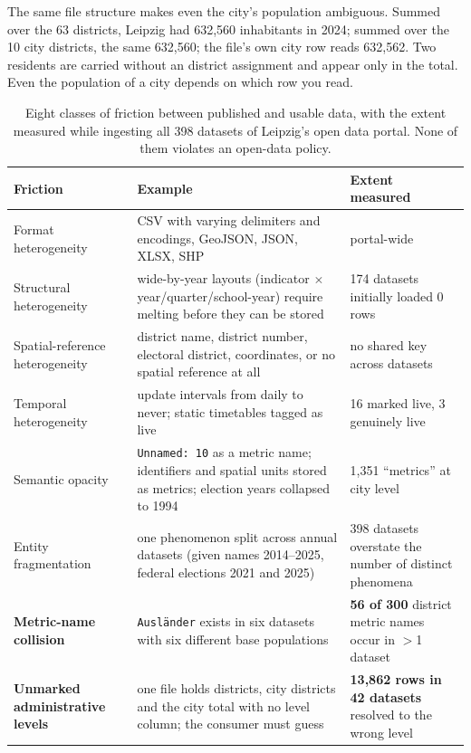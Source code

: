 \documentclass[conference,a4paper]{IEEEtran}
\begin{document}
The same file structure makes even the city's population ambiguous. Summed over
the 63 districts, Leipzig had 632{,}560 inhabitants in 2024; summed over the 10
city districts, the same 632{,}560; the file's own city row reads 632{,}562. Two
residents are carried without an district assignment and appear only in the
total. Even the population of a city depends on which row you read.

\begin{table}[t]
\caption{Eight classes of friction between published and usable data, with the
extent measured while ingesting all 398 datasets of Leipzig's open data portal.
None of them violates an open-data policy.}
\label{tab:frictions}
\centering
\small
\begin{tabular}{@{}p{}p{}p{}@{}}
\toprule
\textbf{Friction} & \textbf{Example} & \textbf{Extent measured} \\
\midrule
Format heterogeneity &
CSV with varying delimiters and encodings, GeoJSON, JSON, XLSX, SHP &
portal-wide \\[2pt]
Structural heterogeneity &
wide-by-year layouts (indicator $\times$ year/quarter/school-year) require
melting before they can be stored &
174 datasets initially loaded 0 rows \\[2pt]
Spatial-reference heterogeneity &
district name, district number, electoral district, coordinates, or no spatial
reference at all &
no shared key across datasets \\[2pt]
Temporal heterogeneity &
update intervals from daily to never; static timetables tagged as live &
16 marked live, 3 genuinely live \\[2pt]
Semantic opacity &
\texttt{Unnamed:~10} as a metric name; identifiers and spatial units stored as
metrics; election years collapsed to 1994 &
1{,}351 ``metrics'' at city level \\[2pt]
Entity fragmentation &
one phenomenon split across annual datasets (given names 2014--2025,
federal elections 2021 and 2025) &
398 datasets overstate the number of distinct phenomena \\[2pt]
\textbf{Metric-name collision} &
\texttt{Ausländer} exists in six datasets with six different base populations &
\textbf{56 of 300} district metric names occur in $>$1 dataset \\[2pt]
\textbf{Unmarked administrative levels} &
one file holds districts, city districts and the city total with no level column;
the consumer must guess &
\textbf{13{,}862 rows in 42 datasets} resolved to the wrong level \\
\bottomrule
\end{tabular}
\end{table}
\end{document}
